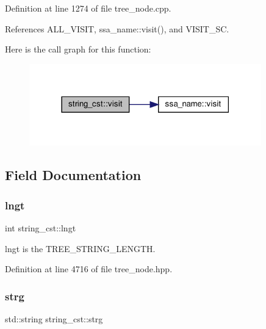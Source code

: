 Definition at line 1274 of file tree\+\_\+node.\+cpp.



References A\+L\+L\+\_\+\+V\+I\+S\+IT, ssa\+\_\+name\+::visit(), and V\+I\+S\+I\+T\+\_\+\+SC.

Here is the call graph for this function\+:
\nopagebreak
\begin{figure}[H]
\begin{center}
\leavevmode
\includegraphics[width=285pt]{d0/da7/structstring__cst_a45a7b808005d8535d6cdf939d6ac2fa5_cgraph}
\end{center}
\end{figure}


\subsection{Field Documentation}
\mbox{\label{structstring__cst_a4a9072c1a97910d10bf3912a12ae4fe9}} 
\subsubsection{\texorpdfstring{lngt}{lngt}}
{\footnotesize\ttfamily int string\+\_\+cst\+::lngt}



lngt is the T\+R\+E\+E\+\_\+\+S\+T\+R\+I\+N\+G\+\_\+\+L\+E\+N\+G\+TH. 



Definition at line 4716 of file tree\+\_\+node.\+hpp.

\mbox{\label{structstring__cst_a37658ad0410eb26cfedc62903e324036}} 
\subsubsection{\texorpdfstring{strg}{strg}}
{\footnotesize\ttfamily std\+::string string\+\_\+cst\+::strg}



